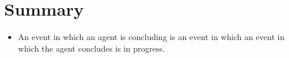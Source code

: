 \section*{Summary}
\label{sec:summary}


\begin{note}
  \begin{itemize}
  \item
    An event in which an agent is concluding is an event in which an event in which the agent concludes is in progress.
  \end{itemize}
\end{note}




